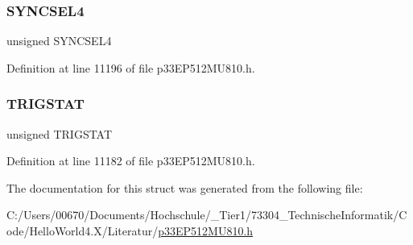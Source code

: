 \subsubsection{\texorpdfstring{S\+Y\+N\+C\+S\+E\+L4}{SYNCSEL4}}
{\footnotesize\ttfamily unsigned S\+Y\+N\+C\+S\+E\+L4}



Definition at line 11196 of file p33\+E\+P512\+M\+U810.\+h.

\mbox{\label{structtag_o_c2_c_o_n2_b_i_t_s_ab379549de54ac93ad4aa73686c34cb7c}} 
\subsubsection{\texorpdfstring{T\+R\+I\+G\+S\+T\+AT}{TRIGSTAT}}
{\footnotesize\ttfamily unsigned T\+R\+I\+G\+S\+T\+AT}



Definition at line 11182 of file p33\+E\+P512\+M\+U810.\+h.



The documentation for this struct was generated from the following file\+:\begin{DoxyCompactItemize}
\item 
C\+:/\+Users/00670/\+Documents/\+Hochschule/\+\_\+\+Tier1/73304\+\_\+\+Technische\+Informatik/\+Code/\+Hello\+World4.\+X/\+Literatur/\hyperlink{p33_e_p512_m_u810_8h}{p33\+E\+P512\+M\+U810.\+h}\end{DoxyCompactItemize}
